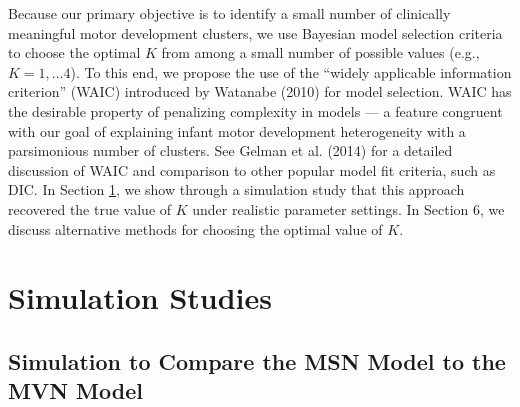 \documentclass[useAMS,referee]{biom}
\begin{document}
Because our primary objective is to identify a small number of clinically meaningful motor development clusters, we use Bayesian model selection criteria to choose the optimal $K$ from among a small number of possible values (e.g., $K=1,...4$). To this end, we propose the use of the ``widely applicable information criterion'' (WAIC) introduced by Watanabe (2010) for model selection. WAIC has the desirable property of penalizing complexity in models --- a feature congruent with our goal of explaining infant motor development heterogeneity with a parsimonious number of clusters. See Gelman et al. (2014) for a detailed discussion of WAIC and comparison to other popular model fit criteria, such as DIC. In Section \ref{s:sim}, we show through a simulation study that this approach recovered the true value of $K$ under realistic parameter settings. In Section 6, we discuss alternative methods for choosing the optimal value of $K$.

\newpage

\section{Simulation Studies}
\label{s:sim}

\subsection{Simulation to Compare the MSN Model to the MVN Model}
\end{document}
